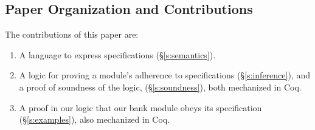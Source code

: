 

\subsection{Paper Organization and Contributions}


%
The contributions of this paper are:\begin{enumerate}
 \item
A language to
express \Nec specifications (\S\ref{s:semantics}).

 \item
A logic for proving a module's adherence to 
 \Nec specifications (\S\ref{s:inference}), and a proof of soundness of the logic, (\S\ref{s:soundness}),
both mechanized in Coq. 
 \item
A proof in our logic %
  that our bank module obeys its \Nec specification (\S\ref{s:examples}),  also  mechanized in Coq.
\end{enumerate}



